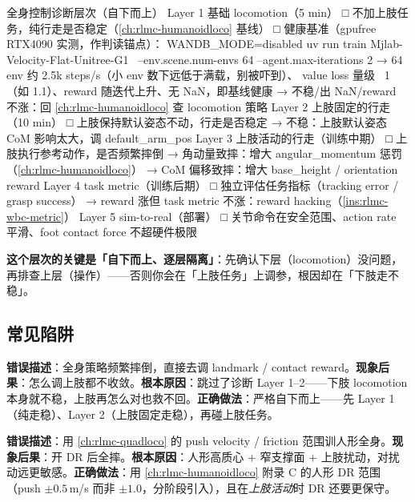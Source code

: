 \begin{codebox}[text]{全身控制诊断层次（自下而上）}
Layer 1 基础 locomotion（5 min）
  □ 不加上肢任务，纯行走是否稳定（\cref{ch:rlmc-humanoidloco} 基线）
  □ 健康基准（gpufree RTX4090 实测，作判读锚点）：
      WANDB_MODE=disabled uv run train Mjlab-Velocity-Flat-Unitree-G1 \
        --env.scene.num-envs 64 --agent.max-iterations 2
      → 64 env 约 2.5k steps/s（小 env 数下远低于满载，别被吓到）、
        value loss 量级 ~1（如 1.1）、reward 随迭代上升、无 NaN，即基线健康
  → 不稳/出 NaN/reward 不涨：回 \cref{ch:rlmc-humanoidloco} 查 locomotion 策略
Layer 2 上肢固定的行走（10 min）
  □ 上肢保持默认姿态不动，行走是否稳定
  → 不稳：上肢默认姿态 CoM 影响太大，调 default_arm_pos
Layer 3 上肢活动的行走（训练中期）
  □ 上肢执行参考动作，是否频繁摔倒
  → 角动量致摔：增大 angular_momentum 惩罚（\cref{ch:rlmc-humanoidloco}）
  → CoM 偏移致摔：增大 base_height / orientation reward
Layer 4 task metric（训练后期）
  □ 独立评估任务指标（tracking error / grasp success）
  → reward 涨但 task metric 不涨：reward hacking（\cref{ins:rlmc-wbc-metric}）
Layer 5 sim-to-real（部署）
  □ 关节命令在安全范围、action rate 平滑、foot contact force 不超硬件极限
\end{codebox}

\textbf{这个层次的关键是「自下而上、逐层隔离」}：先确认下层（locomotion）没问题，再排查上层（操作）——否则你会在「上肢任务」上调参，根因却在「下肢走不稳」。

\subsection{常见陷阱}
\begin{pitfall}
\textbf{错误描述}：全身策略频繁摔倒，直接去调 landmark / contact reward。\textbf{现象后果}：怎么调上肢都不收敛。\textbf{根本原因}：跳过了诊断 Layer 1--2——下肢 locomotion 本身就不稳，上肢再怎么对也救不回。\textbf{正确做法}：严格自下而上——先 Layer 1（纯走稳）、Layer 2（上肢固定走稳），再碰上肢任务。
\end{pitfall}
\begin{pitfall}
\textbf{错误描述}：用 \cref{ch:rlmc-quadloco} 的 push velocity / friction 范围训人形全身。\textbf{现象后果}：开 DR 后全摔。\textbf{根本原因}：人形高质心 $+$ 窄支撑面 $+$ 上肢扰动，对扰动远更敏感。\textbf{正确做法}：用 \cref{ch:rlmc-humanoidloco} 附录 C 的人形 DR 范围（push $\pm0.5$\,m/s 而非 $\pm1.0$，分阶段引入），且在\emph{上肢活动}时 DR 还要更保守。
\end{pitfall}

